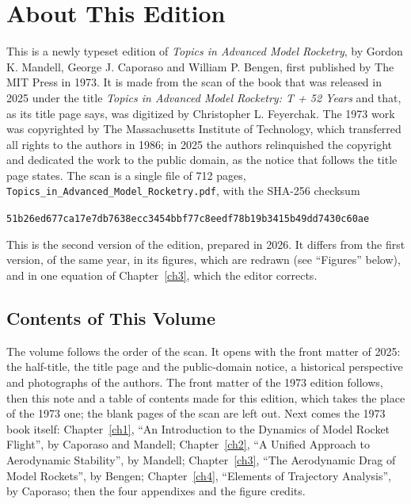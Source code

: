 \chapter{About This Edition}\label{front:about}

This is a newly typeset edition of \emph{Topics in Advanced Model Rocketry}, by Gordon K. Mandell,
George J. Caporaso and William P. Bengen, first published by The MIT Press in 1973. It is made from
the scan of the book that was released in 2025 under the title \emph{Topics in Advanced Model
Rocketry: T + 52 Years} and that, as its title page says, was digitized by Christopher L.
Feyerchak. The 1973 work was copyrighted by The Massachusetts Institute of Technology, which
transferred all rights to the authors in 1986; in 2025 the authors relinquished the copyright and
dedicated the work to the public domain, as the notice that follows the title page states. The
scan is a single file of 712 pages, \texttt{Topics\_in\_Advanced\_Model\_Rocketry.pdf}, with the
SHA-256 checksum
\begin{center}
  \small\texttt{51b26ed677ca17e7db7638ecc3454bbf77c8eedf78b19b3415b49dd7430c60ae}
\end{center}
This is the second version of the edition, prepared in 2026. It differs from the first version, of
the same year, in its figures, which are redrawn (see ``Figures'' below), and in one equation of
Chapter~\ref{ch3}, which the editor corrects.

\section*{Contents of This Volume}

The volume follows the order of the scan. It opens with the front matter of 2025: the half-title,
the title page and the public-domain notice, a historical perspective and photographs of the
authors. The front matter of the 1973 edition follows, then this note and a table of contents made
for this edition, which takes the place of the 1973 one; the blank pages of the scan are left out.
Next comes the 1973 book itself: Chapter~\ref{ch1}, ``An Introduction to the Dynamics of Model
Rocket Flight'', by Caporaso and Mandell; Chapter~\ref{ch2}, ``A Unified Approach to Aerodynamic
Stability'', by Mandell; Chapter~\ref{ch3}, ``The Aerodynamic Drag of Model Rockets'', by Bengen;
Chapter~\ref{ch4}, ``Elements of Trajectory Analysis'', by Caporaso; then the four appendixes and
the figure credits.

